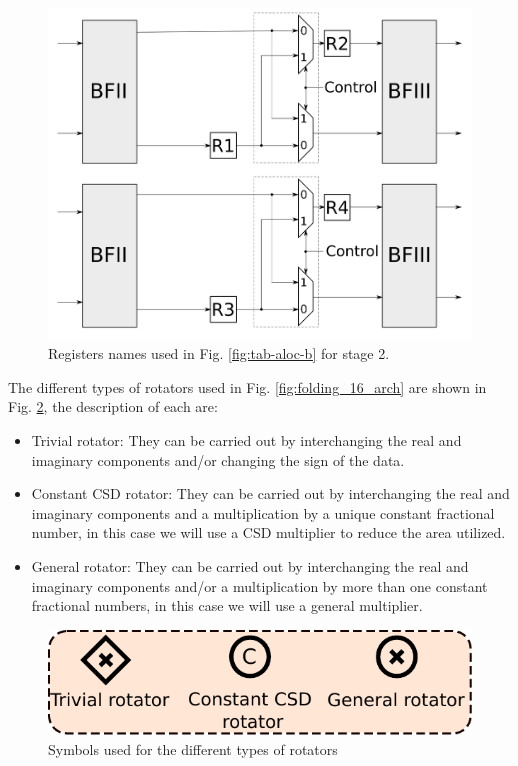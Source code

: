 \documentclass[10pt,times,mathptm,psfig,final,journal,comsoc]{IEEEtran}
\begin{document}
    \begin{figure} 
        \centering
        \includegraphics[width= 0.8\linewidth]{Diagramas/folding_stage2.png}
        \caption{Registers names used in Fig. \ref{fig:tab-aloc-b} for stage 2.}
        \label{fig:folding16_stage2}
    \end{figure}
        

The different types of rotators used in Fig. \ref{fig:folding_16_arch} are shown in Fig. \ref{fig:rotators}, the description of each are:
\begin{itemize}
	\item Trivial rotator: They can be carried out by interchanging the real and imaginary components and/or changing the sign of the data.
	\item Constant CSD rotator: They can be carried out by interchanging the real and imaginary components and a multiplication by a unique constant fractional number, in this case we will use a CSD multiplier to reduce the area utilized.
	\item General rotator: They can be carried out by interchanging the real and imaginary components and/or a multiplication by more than one constant fractional numbers, in this case we will use a general multiplier.
\end{itemize}

\begin{figure} 
	\centering
	\includegraphics[width=0.6\linewidth]{Diagramas/miSeccionFiguras/Rotadores.pdf}
	\caption{Symbols used for the different types of rotators}
	\label{fig:rotators}
\end{figure}
\end{document}
